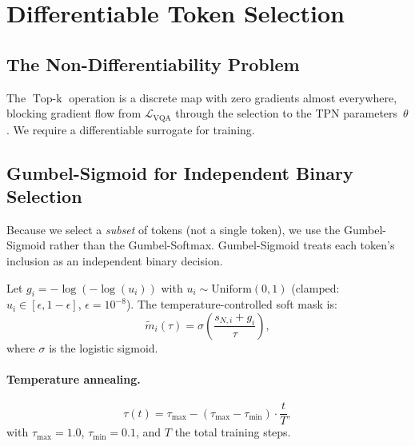 \documentclass[11pt,a4paper]{article}
\DeclareMathOperator{\TopK}{Top\text{-}k}
\begin{document}
\section{Differentiable Token Selection}
\label{sec:gumbel}

\subsection{The Non-Differentiability Problem}

The $\TopK$ operation is a discrete map with zero gradients almost everywhere,
blocking gradient flow from $\mathcal{L}_{\mathrm{VQA}}$ through the
selection to the TPN parameters~$\theta$.
We require a differentiable surrogate for training.

\subsection{Gumbel-Sigmoid for Independent Binary Selection}

Because we select a \emph{subset} of tokens (not a single token), we use the
Gumbel-Sigmoid rather than the Gumbel-Softmax.
Gumbel-Sigmoid treats each token's inclusion as an independent binary
decision.

\begin{definitionbox}[title={Gumbel-Sigmoid Soft Mask}]
Let $g_i = -\log(-\log(u_i))$ with $u_i \sim \mathrm{Uniform}(0,1)$
(clamped: $u_i \in [\epsilon, 1{-}\epsilon]$, $\epsilon{=}10^{-8}$).
The temperature-controlled soft mask is:
\begin{equation}
  \tilde{m}_i(\tau)
    = \sigma\!\!\left(\frac{s_{N,i} + g_i}{\tau}\right),
  \label{eq:gumbel_sigmoid}
\end{equation}
where $\sigma$ is the logistic sigmoid.
\end{definitionbox}

\paragraph{Temperature annealing.}
\begin{equation}
  \tau(t) = \tau_{\max} - (\tau_{\max} - \tau_{\min})
    \cdot \frac{t}{T},
  \label{eq:tau_anneal}
\end{equation}
with $\tau_{\max}{=}1.0$, $\tau_{\min}{=}0.1$, and $T$ the total training
steps.
\end{document}
